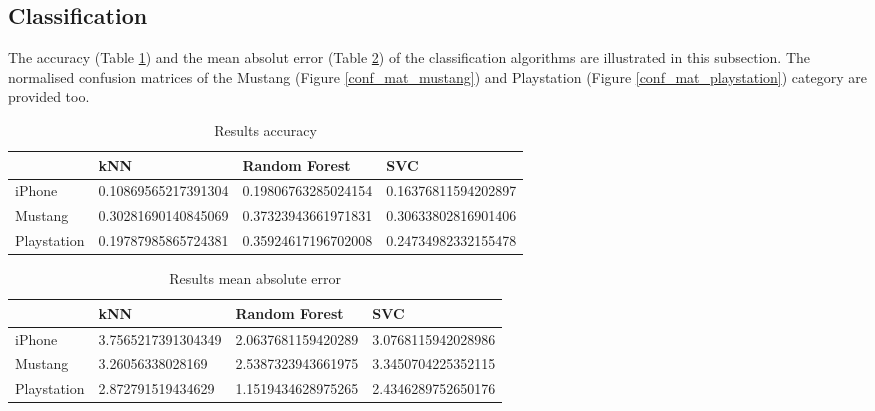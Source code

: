 \subsection{Classification}
The accuracy (Table \ref{tab_acc_results}) and the mean absolut error (Table \ref{tab_mae_results}) of the classification algorithms are illustrated in this subsection. The normalised confusion matrices of the Mustang (Figure \ref{conf_mat_mustang}) and Playstation (Figure \ref{conf_mat_playstation}) category are provided too.
\begin{table}[h]
	\begin{center}
	\begin{tabular}{| p{3.25cm} || p{3.25cm} | p{3.25cm} | p{3.25cm} |}
		\hline
		& kNN & Random Forest & SVC \\
		\hline \hline
		iPhone & 0.10869565217391304 & 0.19806763285024154 & 0.16376811594202897 \\
		\hline
		Mustang & 0.30281690140845069 & 0.37323943661971831 & 0.30633802816901406 \\
		\hline
		Playstation & 0.19787985865724381 & 0.35924617196702008 & 0.24734982332155478 \\
		\hline
	\end{tabular}
	\end{center}
	\caption{Results accuracy}
	\label{tab_acc_results}
\end{table}
\begin{table}[h]
	\begin{center}
	\begin{tabular}{| p{3.25cm} || p{3.25cm} | p{3.25cm} | p{3.25cm} |}
		\hline
		& kNN & Random Forest & SVC \\
		\hline \hline
		iPhone & 3.7565217391304349 & 2.0637681159420289 & 3.0768115942028986 \\
		\hline
		Mustang & 3.26056338028169 & 2.5387323943661975 & 3.3450704225352115 \\
		\hline
		Playstation & 2.872791519434629 & 1.1519434628975265 & 2.4346289752650176 \\
		\hline
	\end{tabular}
	\end{center}
	\caption{Results mean absolute error}
	\label{tab_mae_results}
\end{table}
